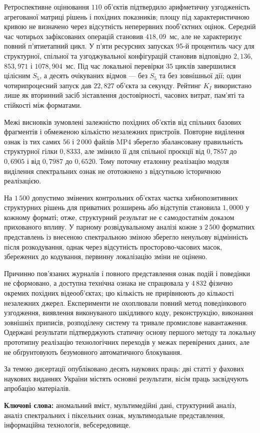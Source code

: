 Ретроспективне оцінювання $110$ об’єктів підтвердило арифметичну узгодженість агрегованої матриці рішень і похідних показників; площу під характеристичною кривою не визначено через відсутність неперервних пооб’єктних оцінок. Середній час чотирьох зафіксованих операцій становив $418{,}09$~мс, але не характеризує повний п’ятиетапний цикл. У п’яти ресурсних запусках 95-й процентиль часу для структурної, спільної та узгоджувальної конфігурацій становив відповідно $2{,}136$, $853{,}971$ і $1078{,}904$~мс. Під час локальної перевірки $35$ циклів завершилися цілісним $S_5$, а десять очікуваних відмов --- без $S_5$ та без зовнішньої дії; один чотирипроцесний запуск дав $22{,}827$ об’єкта за секунду. Рейтинг $K_I$ використано лише як вторинний засіб зіставлення достовірності, часових витрат, пам’яті та стійкості між форматами.

Межі висновків зумовлені залежністю похідних об’єктів від спільних базових фрагментів і обмеженою кількістю незалежних пристроїв. Повторне виділення ознак із тих самих $56$ і $2\,000$ файлів MP4 зберегло збалансовану правильність структурної гілки $0{,}8333$, але змінило її для спільної проєкції від $0{,}7857$ до $0{,}6905$ і від $0{,}7987$ до $0{,}6520$. Тому поточну еталонну реалізацію модуля виділення спектральних ознак не ототожнено з відсутньою історичною реалізацією.

На $1\,500$ допустимо змінених контрольних об’єктах частка хибнопозитивних структурних рішень для приватних розширень або відступів становила $1{,}0000$ у кожному форматі; отже, структурний результат не є самодостатнім доказом прихованого впливу. У парному розвідувальному аналізі кожне з $2\,500$ форматних представлень із внесеною спектральною зміною зберегло ненульову відмінність після розкодування, однак через відсутність просторово-часових масок, збережених до кодування, первинну локалізацію зміни не оцінено.

Причинно пов’язаних журналів і повного представлення ознак подій і поведінки не сформовано, а доступна технічна ознака не спрацювала у $4\,832$ фізично окремих похідних відеооб’єктах; цю кількість не прирівнюють до кількості незалежних джерел. Експерименти не охоплювали повний метод поведінкового узгодження, виявлення виконуваного шкідливого коду, реконструкцію, виконання зовнішніх приписів, розподілену систему та тривале промислове навантаження. Одержані результати підтверджують статичну основу першого методу та локальну прототипну реалізацію технологічних переходів у межах перевірених даних, але не обґрунтовують безумовного автоматичного блокування.

За темою дисертації опубліковано десять наукових праць: дві статті у фахових наукових виданнях України містять основні результати, вісім праць засвідчують апробацію матеріалів.

\textbf{Ключові слова:} аномальний вміст, мультимедійні дані, структурний аналіз, аналіз спектральних і піксельних ознак, мультимодальне представлення, інформаційна технологія, вебсередовище.

\clearpage
